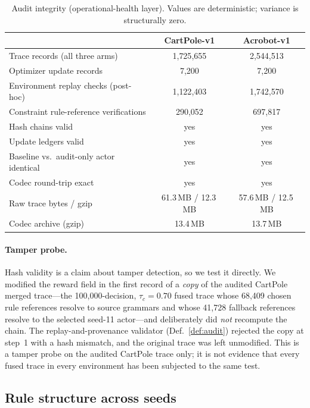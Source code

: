 \documentclass[11pt]{article}
\begin{document}
\begin{table}[t]
\centering
\caption{Audit integrity (operational-health layer). Values are deterministic; variance is
structurally zero.}
\label{tab:integrity}
\begin{tabular}{lcc}
\toprule
 & CartPole-v1 & Acrobot-v1 \\
\midrule
Trace records (all three arms) & 1{,}725{,}655 & 2{,}544{,}513 \\
Optimizer update records & 7{,}200 & 7{,}200 \\
Environment replay checks (post-hoc) & 1{,}122{,}403 & 1{,}742{,}570 \\
Constraint rule-reference verifications & 290{,}052 & 697{,}817 \\
Hash chains valid & yes & yes \\
Update ledgers valid & yes & yes \\
Baseline vs.\ audit-only actor identical & yes & yes \\
Codec round-trip exact & yes & yes \\
Raw trace bytes / gzip & 61.3\,MB / 12.3\,MB & 57.6\,MB / 12.5\,MB \\
Codec archive (gzip) & 13.4\,MB & 13.7\,MB \\
\bottomrule
\end{tabular}
\end{table}

\paragraph{Tamper probe.}
Hash validity is a claim about tamper detection, so we test it directly. We modified the reward field
in the first record of a \emph{copy} of the audited CartPole merged trace---the 100{,}000-decision,
$\tau_c=0.70$ fused trace whose 68{,}409 chosen rule references resolve to source grammars and whose
41{,}728 fallback references resolve to the selected seed-11 actor---and deliberately did \emph{not}
recompute the chain. The replay-and-provenance validator (Def.~\ref{def:audit}) rejected the copy at
step~1 with a hash mismatch, and the original trace was left unmodified. This is a tamper probe on the
audited CartPole trace only; it is not evidence that every fused trace in every environment has been
subjected to the same test.

\subsection{Rule structure across seeds}
\label{sec:experiments:structure}
\end{document}
